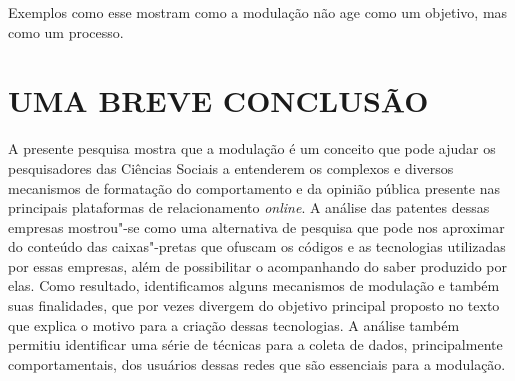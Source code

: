 Exemplos como esse mostram como a modulação não age como um objetivo,
mas como um processo.

\section{UMA BREVE CONCLUSÃO}

\noindent{}A presente pesquisa mostra que a modulação é um conceito que pode ajudar
os pesquisadores das Ciências Sociais a entenderem os complexos e
diversos mecanismos de formatação do comportamento e da opinião pública
presente nas principais plataformas de relacionamento \emph{online}. A análise
das patentes dessas empresas mostrou"-se como uma alternativa de pesquisa
que pode nos aproximar do conteúdo das caixas"-pretas que ofuscam os
códigos e as tecnologias utilizadas por essas empresas, além de
possibilitar o acompanhando do saber produzido por elas. Como resultado,
identificamos alguns mecanismos de modulação e também suas finalidades,
que por vezes divergem do objetivo principal proposto no texto que
explica o motivo para a criação dessas tecnologias. A análise também
permitiu identificar uma série de técnicas para a coleta de dados,
principalmente comportamentais, dos usuários dessas redes que são
essenciais para a modulação.

